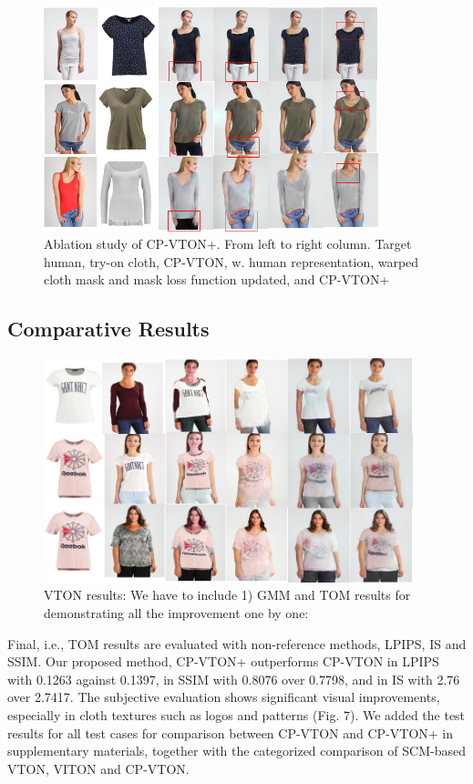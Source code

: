 \begin{figure}
\centering
\includegraphics[height=6.5cm, scale=1]{figures/ablation.png} 
\caption{Ablation study of CP-VTON+. From left to right column. Target human, try-on cloth, CP-VTON, w. human representation, warped cloth mask and mask loss function updated, and CP-VTON+
}
\label{fig:ablation}
\end{figure}


\subsection{Comparative Results}

\begin{figure}
\centering
\includegraphics[height=6.5cm, scale=1]{figures/cpvton+compare.png} 
\caption{VTON results: We have to include 1) GMM and TOM results for demonstrating all the improvement one by one: }
\label{fig:vtonresults}
\end{figure}


Final, i.e., TOM results are evaluated with non-reference methods, LPIPS, IS and SSIM. Our proposed method, CP-VTON+ outperforms CP-VTON in LPIPS with 0.1263 against 0.1397, in SSIM with 0.8076 over 0.7798, and in IS with 2.76 over 2.7417. The subjective evaluation shows significant visual improvements, especially in cloth textures such as logos and patterns (Fig. 7). We added the test results for all test cases for comparison between CP-VTON and CP-VTON+ in supplementary materials, together with the categorized comparison of SCM-based VTON, VITON and CP-VTON.



